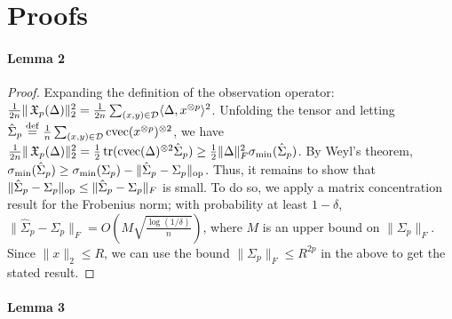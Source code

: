 \section{Proofs}
\label{sec:proofs}

\paragraph{Lemma 2}

\begin{proof}
Expanding the definition of the observation operator:
$\frac{1}{2n} \|\operatorname{\mathfrak{X}}_p(\Delta)\|_2^2
= \frac{1}{2n} \sum_{(x,y) \in \mathcal{D}} \langle \Delta, x^{\otimes p} \rangle^2$.
Unfolding the tensor and letting $\hat\Sigma_p \stackrel{\rm def}{=} \frac{1}{n} \sum_{(x,y) \in \mathcal{D}} \operatorname{cvec}(x^{\otimes p})^{\otimes 2}$,
we have 
$\frac{1}{2n} \|\operatorname{\mathfrak{X}}_p(\Delta)\|_2^2
= \frac{1}{2} \operatorname{tr}(\operatorname{cvec}(\Delta)^{\otimes 2} \hat\Sigma_p)
\ge \frac{1}{2} \|\Delta\|_F^2 \sigma_\text{\rm min}(\hat\Sigma_p)$.
By Weyl's theorem, $\sigma_\text{\rm min}(\hat\Sigma_p) \ge \sigma_\text{\rm min}(\Sigma_p) - \|\hat\Sigma_p - \Sigma_p\|_{\text{op}}$. 
Thus, it remains to show that $\|\hat\Sigma_p - \Sigma_p\|_{\text{op}} \le \|\hat\Sigma_p - \Sigma_p\|_{F}$ is small. 
To do so, we apply a matrix concentration result for the Frobenius norm\citationneeded; with probability at least $1 - \delta$, 
$\| \hat\Sigma_p - \Sigma_p \|_F = O\left( M \sqrt{\frac{\log(1/\delta)}{n}} \right)$,
where $M$ is an upper bound on $\| \Sigma_p \|_F$. Since $\|x\|_2 \le R$, we can use the bound $\| \Sigma_p \|_F \le R^{2p}$ in the above to get the stated result. 

\end{proof}

\paragraph{Lemma 3}

